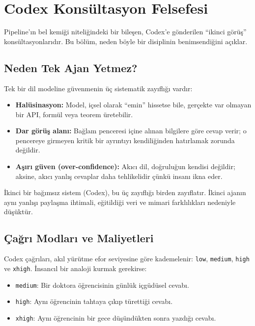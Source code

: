 \section{Codex Konsültasyon Felsefesi}
\label{sec:ma_codex}

Pipeline'ın bel kemiği niteliğindeki bir bileşen, Codex'e gönderilen
``ikinci görüş'' konsültasyonlarıdır. Bu bölüm, neden böyle bir
disiplinin benimsendiğini açıklar.

\subsection{Neden Tek Ajan Yetmez?}

Tek bir dil modeline güvenmenin üç sistematik zayıflığı vardır:

\begin{itemize}
  \item \textbf{Halüsinasyon:} Model, içsel olarak ``emin'' hissetse
        bile, gerçekte var olmayan bir API, formül veya teorem üretebilir.
  \item \textbf{Dar görüş alanı:} Bağlam penceresi içine alınan
        bilgilere göre cevap verir; o pencereye girmeyen kritik bir
        ayrıntıyı kendiliğinden hatırlamak zorunda değildir.
  \item \textbf{Aşırı güven (over-confidence):} Akıcı dil, doğruluğun
        kendisi değildir; aksine, akıcı yanlış cevaplar daha tehlikelidir
        çünkü insanı ikna eder.
\end{itemize}

İkinci bir bağımsız sistem (Codex), bu üç zayıflığı birden zayıflatır.
İkinci ajanın aynı yanlışı paylaşma ihtimali, eğitildiği veri ve
mimari farklılıkları nedeniyle düşüktür.

\subsection{Çağrı Modları ve Maliyetleri}

Codex çağrıları, akıl yürütme efor seviyesine göre kademelenir:
\texttt{low}, \texttt{medium}, \texttt{high} ve \texttt{xhigh}.
İnsancıl bir analoji kurmak gerekirse:

\begin{itemize}
  \item \texttt{medium}: Bir doktora öğrencisinin günlük içgüdüsel cevabı.
  \item \texttt{high}: Aynı öğrencinin tahtaya çıkıp türettiği cevabı.
  \item \texttt{xhigh}: Aynı öğrencinin bir gece düşündükten sonra
        yazdığı cevabı.
\end{itemize}

